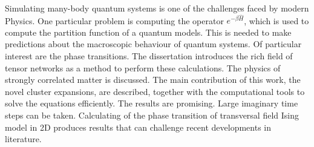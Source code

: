 Simulating many-body quantum systems is one of the challenges faced by modern Physics. One particular problem is computing the operator $e^{-\beta \hat{H}}$, which is used to compute the partition function of a quantum models.  This is needed to make predictions about the macroscopic behaviour of quantum systems. Of particular interest are the phase transitions. The dissertation introduces the rich field of tensor networks as a method to perform these calculations. The physics of strongly correlated matter is discussed. The main contribution of this work, the novel cluster expansions, are described, together with the computational tools to solve the equations efficiently. The results are promising. Large imaginary time steps can be taken. Calculating of the phase transition of transversal field Ising model in 2D produces results that can challenge recent developments in literature.
